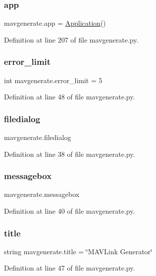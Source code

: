 \subsubsection{\texorpdfstring{app}{app}}
{\footnotesize\ttfamily mavgenerate.\+app = \mbox{\hyperlink{classmavgenerate_1_1Application}{Application}}()}



Definition at line 207 of file mavgenerate.\+py.

\mbox{\label{namespacemavgenerate_a1761dbc960fbb664cff6f950e36a172f}} 
\subsubsection{\texorpdfstring{error\_limit}{error\_limit}}
{\footnotesize\ttfamily int mavgenerate.\+error\+\_\+limit = 5}



Definition at line 48 of file mavgenerate.\+py.

\mbox{\label{namespacemavgenerate_a7b6cad00167b3e4c72880cc2ec6ae0dc}} 
\subsubsection{\texorpdfstring{filedialog}{filedialog}}
{\footnotesize\ttfamily mavgenerate.\+filedialog}



Definition at line 38 of file mavgenerate.\+py.

\mbox{\label{namespacemavgenerate_ac6129ad292c9e30313d3b4152e519558}} 
\subsubsection{\texorpdfstring{messagebox}{messagebox}}
{\footnotesize\ttfamily mavgenerate.\+messagebox}



Definition at line 40 of file mavgenerate.\+py.

\mbox{\label{namespacemavgenerate_a0fc7c0cc014ba86fd1594a1c69a0a127}} 
\subsubsection{\texorpdfstring{title}{title}}
{\footnotesize\ttfamily string mavgenerate.\+title = \char`\"{}M\+A\+V\+Link Generator\char`\"{}}



Definition at line 47 of file mavgenerate.\+py.

